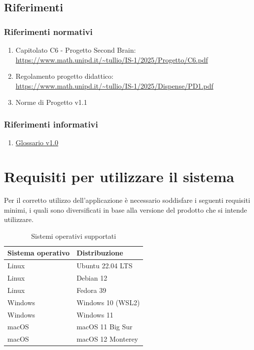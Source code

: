 \documentclass[a4paper,10pt]{article}
\begin{document}
\subsection{Riferimenti}
\subsubsection{Riferimenti normativi}
\begin{enumerate}
    \item Capitolato C6 - Progetto Second Brain: \\ \url{https://www.math.unipd.it/~tullio/IS-1/2025/Progetto/C6.pdf}
    \item Regolamento progetto didattico: \\ \url{https://www.math.unipd.it/~tullio/IS-1/2025/Dispense/PD1.pdf}
    \item Norme di Progetto v1.1
\end{enumerate}
\subsubsection{Riferimenti informativi}
\begin{enumerate}
    \item \href{https://tool-8.github.io/Documentazione-SWE/glossario/Glossario.pdf}{Glossario v1.0} 
\end{enumerate}

\section{Requisiti per utilizzare il sistema}
Per il corretto utilizzo dell'applicazione è necessario soddisfare i seguenti requisiti minimi, i quali sono diversificati in base alla versione del prodotto che si intende utilizzare. 

\begin{table}[H]
\centering
\renewcommand{\arraystretch}{1.3}
\begin{tabular}{|l|l|}
\hline
\textbf{Sistema operativo} & \textbf{Distribuzione} \\ \hline

Linux & Ubuntu 22.04 LTS \\ 
Linux & Debian 12 \\ 
Linux & Fedora 39 \\ 

Windows & Windows 10 (WSL2) \\ 
Windows & Windows 11 \\ 

macOS & macOS 11 Big Sur \\ 
macOS & macOS 12 Monterey \\ \hline

\end{tabular}
\caption{Sistemi operativi supportati}
\end{table}
\end{document}
